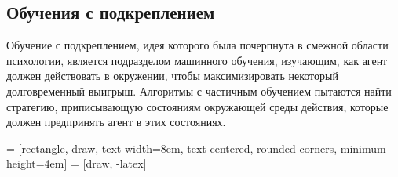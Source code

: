 \documentclass[a4paper,12pt]{article}
\begin{document}
\subsection{Обучения с подкреплением }
Обучение с подкреплением, идея которого была почерпнута в смежной области психологии, является подразделом машинного обучения, изучающим, как агент должен действовать в окружении, чтобы максимизировать некоторый долговременный выигрыш. Алгоритмы с частичным обучением пытаются найти стратегию, приписывающую состояниям окружающей среды действия, которые должен предпринять агент в этих состояниях. 
\begin{center}
     = [rectangle, draw, 
    text width=8em, text centered, rounded corners, minimum height=4em]
     = [draw, -latex]
\end{center}{}
\end{document}
